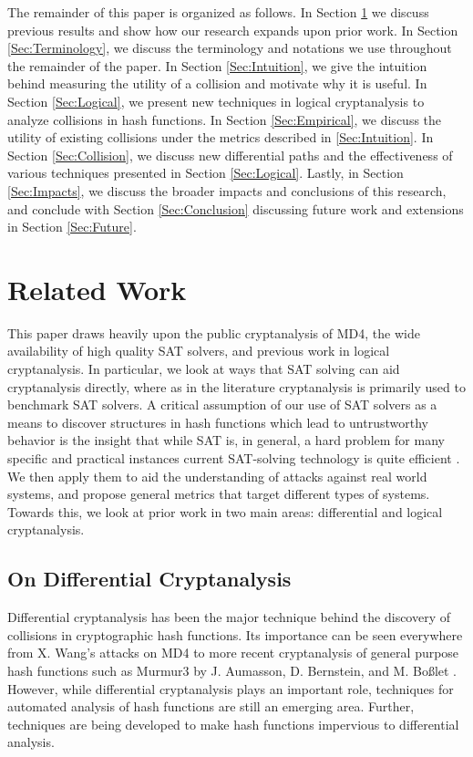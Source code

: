 \documentclass[conference]{IEEEtran}
\begin{document}
The remainder of this paper is organized as follows. In Section
\ref{Sec:Related} we discuss previous results and show how our research
expands upon prior work. In Section \ref{Sec:Terminology}, we discuss the
terminology and notations we use throughout the remainder of the paper.
In Section \ref{Sec:Intuition}, we give the intuition behind measuring
the utility of a collision and motivate why it is useful. In Section
\ref{Sec:Logical}, we present new techniques in logical cryptanalysis to
analyze collisions in hash functions. In Section \ref{Sec:Empirical}, we
discuss the utility of existing collisions under the metrics described in
\ref{Sec:Intuition}. In Section \ref{Sec:Collision}, we discuss new
differential paths and the effectiveness of various techniques presented
in Section \ref{Sec:Logical}. Lastly, in Section \ref{Sec:Impacts}, we
discuss the broader impacts and conclusions of this research, and
conclude with Section \ref{Sec:Conclusion} discussing future work and
extensions in Section \ref{Sec:Future}.

\section{Related Work} \label{Sec:Related}

This paper draws heavily upon the public cryptanalysis of MD4, the wide
availability of high quality SAT solvers, and previous work in logical
cryptanalysis. In particular, we look at ways that SAT solving can aid
cryptanalysis directly, where as in the literature cryptanalysis is
primarily used to benchmark SAT
solvers.  A critical assumption of our use of SAT solvers as a means
to discover structures in hash functions which lead to untrustworthy
behavior is the insight that while SAT is, in general, a hard problem
for many specific and practical instances current SAT-solving
technology is quite efficient \cite{vardi2010p}. We
then apply them to aid the understanding of attacks against real world
systems, and propose general metrics that target different types of systems.
Towards this, we look at prior work in two main areas: differential and logical
cryptanalysis.

\subsection{On Differential Cryptanalysis}

Differential cryptanalysis has been the major technique behind the discovery
of collisions in cryptographic hash functions. Its importance can be seen
everywhere from X. Wang's attacks on MD4 \cite{Wang2005} to more recent
cryptanalysis of general purpose hash functions such as Murmur3 by
J. Aumasson, D. Bernstein, and M. Bo{\ss}let \cite{murmur3DC}. However, while
differential cryptanalysis plays an important role, techniques for automated
analysis of hash functions are still an emerging area. Further, techniques
are being developed to make hash functions impervious to differential
analysis.
\end{document}

